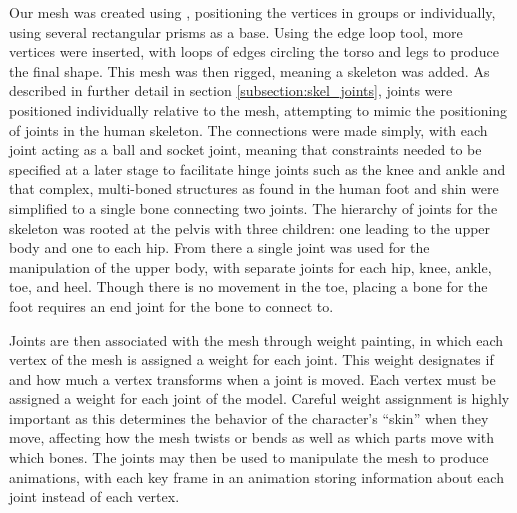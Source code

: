 Our mesh was created using \maya{} \cite{maya}, positioning the vertices in groups or individually, using several rectangular prisms as a base.  Using the edge loop tool, more vertices were inserted, with loops of edges circling the torso and legs to produce the final shape.  This mesh was then rigged, meaning a skeleton was added.  As described in further detail in section \ref{subsection:skel_joints}, joints were positioned individually relative to the mesh, attempting to mimic the positioning of joints in the human skeleton.  The connections were made simply, with each joint acting as a ball and socket joint, meaning that constraints needed to be specified at a later stage to facilitate hinge joints such as the knee and ankle and that complex, multi-boned structures as found in the human foot and shin were simplified to a single bone connecting two joints.  The hierarchy of joints for the skeleton was rooted at the pelvis with three children: one leading to the upper body and one to each hip.  From there a single joint was used for the manipulation of the upper body, with separate joints for each hip, knee, ankle, toe, and heel.  Though there is no movement in the toe, placing a bone for the foot requires an end joint for the bone to connect to.

Joints are then associated with the mesh through weight painting, in which each vertex of the mesh is assigned a weight for each joint.  This weight designates if and how much a vertex transforms when a joint is moved.  Each vertex must be assigned a weight for each joint of the model.  Careful weight assignment is highly important as this determines the behavior of the character's ``skin'' when they move, affecting how the mesh twists or bends as well as which parts move with which bones.  The joints may then be used to manipulate the mesh to produce animations, with each key frame in an animation storing information about each joint instead of each vertex. %

